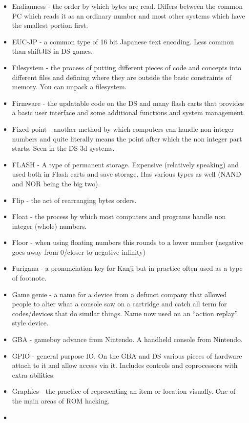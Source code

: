 \documentclass[
]{book}
\begin{document}
\begin{itemize}
\item
  Endianness - the order by which bytes are read. Differs between the common PC which reads it as an ordinary number and most other systems which have the smallest portion first.
\item
  EUC-JP - a common type of 16 bit Japanese text encoding. Less common than shiftJIS in DS games.
\item
  Filesystem - the process of putting different pieces of code and concepts into different files and defining where they are outside the basic constraints of memory. You can unpack a filesystem.
\item
  Firmware - the updatable code on the DS and many flash carts that provides a basic user interface and some additional functions and system management.
\item
  Fixed point - another method by which computers can handle non integer numbers and quite literally means the point after which the non integer part starts. Seen in the DS 3d systems.
\item
  FLASH - A type of permanent storage. Expensive (relatively speaking) and used both in Flash carts and save storage. Has various types as well (NAND and NOR being the big two).
\item
  Flip - the act of rearranging bytes orders.
\item
  Float - the process by which most computers and programs handle non integer (whole) numbers.
\item
  Floor - when using floating numbers this rounds to a lower number (negative goes away from 0/closer to negative infinity)
\item
  Furigana - a pronunciation key for Kanji but in practice often used as a type of footnote.
\item
  Game genie - a name for a device from a defunct company that allowed people to alter what a console saw on a cartridge and catch all term for codes/devices that do similar things. Name now used on an ``action replay'' style device.
\item
  GBA - gameboy advance from Nintendo. A handheld console from Nintendo.
\item
  GPIO - general purpose IO. On the GBA and DS various pieces of hardware attach to it and allow access via it. Includes controls and coprocessors with extra abilities.
\item
  Graphics - the practice of representing an item or location visually. One of the main areas of ROM hacking.
\item

\end{itemize}
\end{document}
